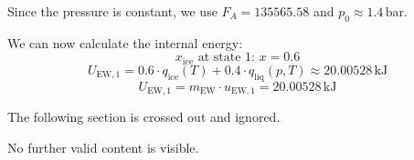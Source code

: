Since the pressure is constant, we use \( F_A = 135565.58 \) and \( p_0 \approx 1.4 \, \text{bar} \).  

We can now calculate the internal energy:  
\[
x_{\text{ice}} \text{ at state 1: } x = 0.6
\]  
\[
U_{\text{EW},1} = 0.6 \cdot q_{\text{ice}}(T) + 0.4 \cdot q_{\text{liq}}(p,T) \approx 20.00528 \, \text{kJ}
\]  
\[
U_{\text{EW},1} = m_{\text{EW}} \cdot u_{\text{EW},1} = 20.00528 \, \text{kJ}
\]  

The following section is crossed out and ignored.  

No further valid content is visible.